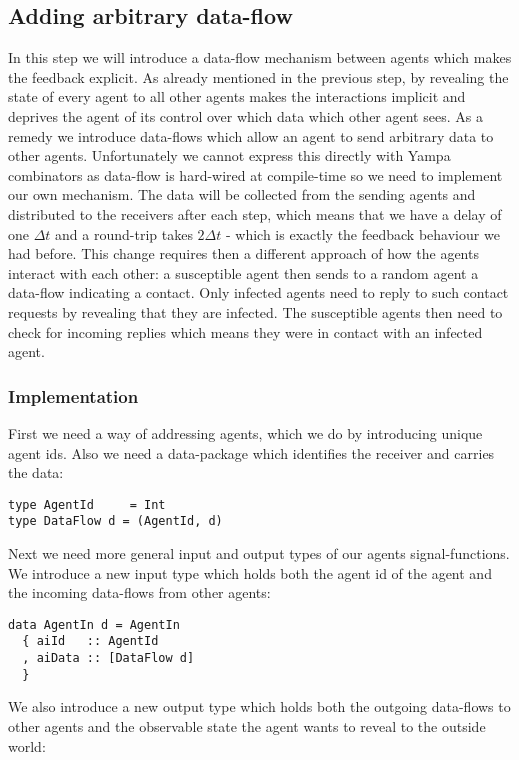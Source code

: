 \subsection{Adding arbitrary data-flow}
\label{sec:step3_dataflow}
In this step we will introduce a data-flow mechanism between agents which makes the feedback explicit. As already mentioned in the previous step, by revealing the state of every agent to all other agents makes the interactions implicit and deprives the agent of its control over which data which other agent sees. As a remedy we introduce data-flows which allow an agent to send arbitrary data to other agents. Unfortunately we cannot express this directly with Yampa combinators as data-flow is hard-wired at compile-time so we need to implement our own mechanism. The data will be collected from the sending agents and distributed to the receivers after each step, which means that we have a delay of one $\Delta t$ and a round-trip takes $2 \Delta t$ - which is exactly the feedback behaviour we had before.
This change requires then a different approach of how the agents interact with each other: a susceptible agent then sends to a random agent a data-flow indicating a contact. Only infected agents need to reply to such contact requests by revealing that they are infected. The susceptible agents then need to check for incoming replies which means they were in contact with an infected agent.

\subsubsection{Implementation}
First we need a way of addressing agents, which we do by introducing unique agent ids. Also we need a data-package which identifies the receiver and carries the data:
\begin{verbatim}
type AgentId     = Int
type DataFlow d = (AgentId, d)
\end{verbatim}

Next we need more general input and output types of our agents signal-functions. We introduce a new input type which holds both the agent id of the agent and the incoming data-flows from other agents:

\begin{verbatim}
data AgentIn d = AgentIn
  { aiId   :: AgentId
  , aiData :: [DataFlow d]
  } 
\end{verbatim}

We also introduce a new output type which holds both the outgoing data-flows to other agents and the observable state the agent wants to reveal to the outside world:


